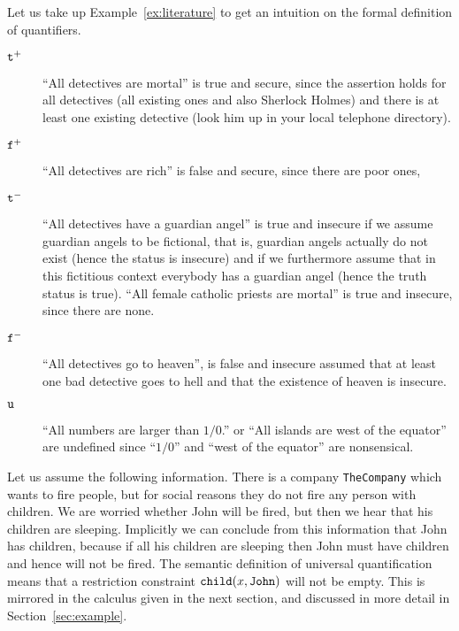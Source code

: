 \documentclass{\filespath jancl}
\newcommand\COMP{{\tt TheCompany}}
\newcommand{\undefined}{{\tt u}}
\newcommand{\twts}{{{\tt t}^+}}
\newcommand{\twfs}{{{\tt f}^+}}
\newcommand{\twti}{{{\tt t}^-}}
\newcommand{\twfi}{{{\tt f}^-}}
\begin{document}
\begin{example}\label{ex:literature-quantifiers}
  Let us take up Example~\ref{ex:literature} to get an intuition on the formal
  definition of quantifiers.
  \begin{description}
  \item[\phantom{--} $\twts$] ``All detectives are mortal'' is true and secure, since the
    assertion holds for all detectives (all existing ones and also Sherlock
    Holmes) and there is at least one existing detective (look him up in your
    local telephone directory).
  \item[\phantom{--} $\twfs$] ``All detectives are rich'' is false and secure, since there
    are poor ones, 
  \item[\phantom{--} $\twti$] ``All detectives have a guardian angel''
    is true and insecure if we assume guardian angels to be fictional,
    that is, guardian angels actually do not exist (hence the status
    is insecure) and if we furthermore assume that in this fictitious
    context everybody has a guardian angel (hence the truth status is
    true). ``All female catholic priests are mortal'' is true and
    insecure, since there are none.
  \item[\phantom{--} $\twfi$] ``All detectives go to heaven'', is
    false and insecure assumed that at least one bad detective goes to
    hell and that the existence of heaven is insecure.
  \item[\phantom{--} $\undefined$\phantom{+}] ``All numbers are larger than $1/0$.'' or ``All
    islands are west of the equator'' are undefined since ``$1/0$'' and ``west of the
    equator'' are nonsensical.
  \end{description}
\end{example}

\begin{example}\label{ex-John}
  Let us assume the following information. There is a company {\COMP}
  which wants to fire people, but for social reasons they do not
  fire any person with children. We are worried whether John will be
  fired, but then we hear that his children are sleeping. Implicitly
  we can conclude from this information that John has children,
  because if all his children are sleeping then John must have
  children and hence will not be fired. The semantic definition of
  universal quantification means that a restriction constraint ${\tt
    child}(x,{\tt John})$ will not be empty. This is mirrored in the
  calculus given in the next section, and discussed in more detail in
  Section~\ref{sec:example}.
\end{example}
\end{document}
